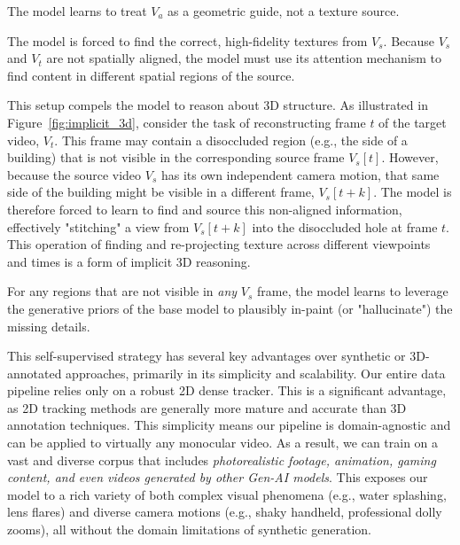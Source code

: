 \begin{description}[noitemsep, topsep=0pt, partopsep=0pt, leftmargin=0pt, style=unboxed, font=\normalfont\bfseries]
    \item[Ignoring Anchor Artifacts] The model learns to treat $V_{a}$ as a geometric guide, not a texture source.
    \item[Spatial Content Sourcing] The model is forced to find the correct, high-fidelity textures from $V_{s}$. Because $V_{s}$ and $V_{t}$ are not spatially aligned, the model must use its attention mechanism to find content in different spatial regions of the source.
    \item[Implicit 3D Reasoning] This setup compels the model to reason about 3D structure. As illustrated in Figure~\ref{fig:implicit_3d}, consider the task of reconstructing frame $t$ of the target video, $V_t$. This frame may contain a disoccluded region (e.g., the side of a building) that is not visible in the corresponding source frame $V_s[t]$. However, because the source video $V_s$ has its own independent camera motion, that same side of the building might be visible in a different frame, $V_s[t+k]$. The model is therefore forced to learn to find and source this non-aligned information, effectively "stitching" a view from $V_s[t+k]$ into the disoccluded hole at frame $t$. This operation of finding and re-projecting texture across different viewpoints and times is a form of implicit 3D reasoning.
    \item[Generative In-painting] For any regions that are not visible in \textit{any} $V_{s}$ frame, the model learns to leverage the generative priors of the base model to plausibly in-paint (or "hallucinate") the missing details.
\end{description}




This self-supervised strategy has several key advantages over synthetic or 3D-annotated approaches, primarily in its simplicity and scalability. Our entire data pipeline relies only on a robust 2D dense tracker. This is a significant advantage, as 2D tracking methods are generally more mature and accurate than 3D annotation techniques. This simplicity means our pipeline is domain-agnostic and can be applied to virtually any monocular video. As a result, we can train on a vast and diverse corpus that includes \textit{photorealistic footage, animation, gaming content, and even videos generated by other Gen-AI models}. This exposes our model to a rich variety of both complex visual phenomena (e.g., water splashing, lens flares) and diverse camera motions (e.g., shaky handheld, professional dolly zooms), all without the domain limitations of synthetic generation.

